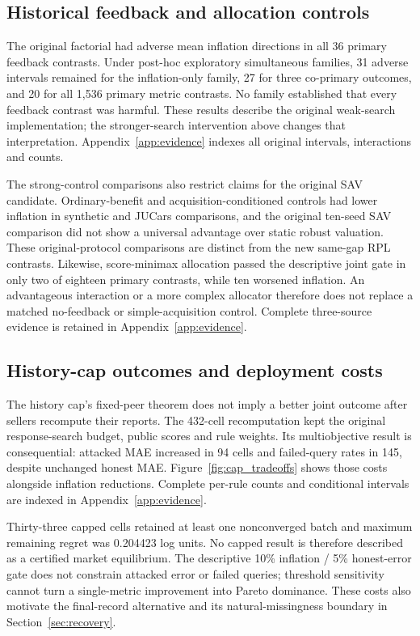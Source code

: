 \documentclass[11pt]{article}
\begin{document}
\subsection{Historical feedback and allocation controls}\label{sec:factorial_results}
The original factorial had adverse mean inflation directions in all 36
primary feedback contrasts. Under post-hoc exploratory simultaneous families,
31 adverse intervals remained for the inflation-only family, 27 for three
co-primary outcomes, and 20 for all 1,536 primary metric contrasts. No family
established that every feedback contrast was harmful. These results describe
the original weak-search implementation; the stronger-search intervention
above changes that interpretation. Appendix~\ref{app:evidence}
indexes all original intervals, interactions and counts.

The strong-control comparisons also restrict claims for the original SAV
candidate. Ordinary-benefit and acquisition-conditioned controls had lower
inflation in synthetic and JUCars comparisons, and the original ten-seed SAV
comparison did not show a universal advantage over static robust valuation.
These original-protocol comparisons are distinct from the new same-gap RPL
contrasts. Likewise, score-minimax allocation passed the descriptive joint
gate in only two of eighteen primary contrasts, while ten worsened inflation.
An advantageous interaction or a more complex allocator therefore does not
replace a matched no-feedback or simple-acquisition control. Complete
three-source evidence is retained in Appendix~\ref{app:evidence}.

\subsection{History-cap outcomes and deployment costs}
The history cap's fixed-peer theorem does not imply a better joint outcome
after sellers recompute their reports. The 432-cell recomputation kept the
original response-search budget, public scores and rule weights. Its
multiobjective result is consequential: attacked MAE increased in 94 cells
and failed-query rates in 145, despite unchanged honest MAE. Figure~\ref{fig:cap_tradeoffs}
shows those costs alongside inflation reductions. Complete per-rule counts
and conditional intervals are indexed in Appendix~\ref{app:evidence}.

Thirty-three capped cells retained at least one nonconverged batch and maximum
remaining regret was 0.204423 log units. No capped result is therefore
described as a certified market equilibrium. The descriptive 10\% inflation /
5\% honest-error gate does not constrain attacked error or failed queries;
threshold sensitivity cannot turn a single-metric improvement into Pareto
dominance. These costs also motivate the final-record alternative and its
natural-missingness boundary in Section~\ref{sec:recovery}.
\end{document}
